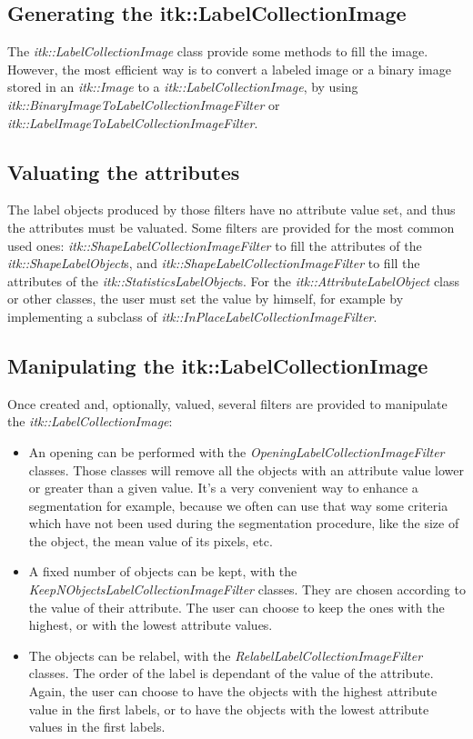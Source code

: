 \documentclass{InsightArticle}
\begin{document}
\subsection{Generating the itk::LabelCollectionImage}

The {\em itk::LabelCollectionImage} class provide some methods to fill the
image. However, the most efficient way is to convert a labeled image or a binary
image stored in an {\em itk::Image} to a {\em itk::LabelCollectionImage}, by
using {\em itk::BinaryImageToLabelCollectionImageFilter} or {\em
itk::LabelImageToLabelCollectionImageFilter}.

\subsection{Valuating the attributes}

The label objects produced by those filters have no attribute value set, and
thus the attributes must be valuated. Some filters are provided for the most
common used ones: {\em itk::ShapeLabelCollectionImageFilter} to fill the
attributes of the {\em itk::ShapeLabelObject}s, and {\em
itk::ShapeLabelCollectionImageFilter} to fill the attributes of the {\em
itk::StatisticsLabelObject}s. For the {\em itk::AttributeLabelObject} class or
other classes, the user must set the value by himself, for example by
implementing a subclass of {\em itk::InPlaceLabelCollectionImageFilter}.

\subsection{Manipulating the itk::LabelCollectionImage}

Once created and, optionally, valued, several filters are provided to manipulate
the {\em itk::LabelCollectionImage}:

\begin{itemize}
  \item An opening can be performed with the {\em
OpeningLabelCollectionImageFilter} classes. Those classes will remove all the
objects with an attribute value lower or greater than a given value. It's a very
convenient way to enhance a segmentation for example, because we often can use
that way some criteria  which have not been used during the segmentation
procedure, like the size of the object, the mean value of its pixels, etc.
  \item A fixed number of objects can be kept, with the {\em
KeepNObjectsLabelCollectionImageFilter} classes. They are chosen according to
the value of their attribute. The user can choose to keep the ones with the
highest, or with the lowest attribute values.
  \item The objects can be relabel, with the {\em
RelabelLabelCollectionImageFilter} classes. The order of the label is dependant
of the value of the attribute. Again, the user can choose to have the objects
with the highest attribute value in the first labels, or to have the objects
with the lowest attribute values in the first labels.
\end{itemize}
\end{document}
